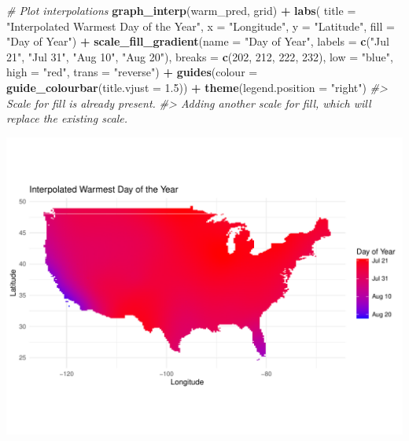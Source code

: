\documentclass[
]{article}
\newenvironment{Shaded}{\begin{snugshade}}{\end{snugshade}}
\newcommand{\AttributeTok}[1]{\textcolor[rgb]{0.13,0.29,0.53}{#1}}
\newcommand{\CommentTok}[1]{\textcolor[rgb]{0.56,0.35,0.01}{\textit{#1}}}
\newcommand{\DecValTok}[1]{\textcolor[rgb]{0.00,0.00,0.81}{#1}}
\newcommand{\FloatTok}[1]{\textcolor[rgb]{0.00,0.00,0.81}{#1}}
\newcommand{\FunctionTok}[1]{\textcolor[rgb]{0.13,0.29,0.53}{\textbf{#1}}}
\newcommand{\NormalTok}[1]{#1}
\newcommand{\SpecialCharTok}[1]{\textcolor[rgb]{0.81,0.36,0.00}{\textbf{#1}}}
\newcommand{\StringTok}[1]{\textcolor[rgb]{0.31,0.60,0.02}{#1}}
\begin{document}
\begin{Shaded}
\begin{Highlighting}[]
\CommentTok{\# Plot interpolations}
\FunctionTok{graph\_interp}\NormalTok{(warm\_pred, grid) }\SpecialCharTok{+} 
  \FunctionTok{labs}\NormalTok{( }\AttributeTok{title =} \StringTok{"Interpolated Warmest Day of the Year"}\NormalTok{,}
    \AttributeTok{x =} \StringTok{"Longitude"}\NormalTok{, }\AttributeTok{y =} \StringTok{"Latitude"}\NormalTok{, }
    \AttributeTok{fill =} \StringTok{"Day of Year"}\NormalTok{) }\SpecialCharTok{+}
\FunctionTok{scale\_fill\_gradient}\NormalTok{(}\AttributeTok{name =} \StringTok{"Day of Year"}\NormalTok{, }
                    \AttributeTok{labels =} \FunctionTok{c}\NormalTok{(}\StringTok{"Jul 21"}\NormalTok{, }\StringTok{"Jul 31"}\NormalTok{, }\StringTok{"Aug 10"}\NormalTok{, }\StringTok{"Aug 20"}\NormalTok{), }
                       \AttributeTok{breaks =} \FunctionTok{c}\NormalTok{(}\DecValTok{202}\NormalTok{, }\DecValTok{212}\NormalTok{, }\DecValTok{222}\NormalTok{, }\DecValTok{232}\NormalTok{), }
                    \AttributeTok{low =} \StringTok{"blue"}\NormalTok{, }\AttributeTok{high =} \StringTok{"red"}\NormalTok{, }
                    \AttributeTok{trans =} \StringTok{"reverse"}\NormalTok{) }\SpecialCharTok{+}
  \FunctionTok{guides}\NormalTok{(}\AttributeTok{colour =} \FunctionTok{guide\_colourbar}\NormalTok{(}\AttributeTok{title.vjust =} \FloatTok{1.5}\NormalTok{)) }\SpecialCharTok{+}
  \FunctionTok{theme}\NormalTok{(}\AttributeTok{legend.position =} \StringTok{"right"}\NormalTok{)}
\CommentTok{\#\textgreater{} Scale for fill is already present.}
\CommentTok{\#\textgreater{} Adding another scale for fill, which will replace the existing scale.}
\end{Highlighting}
\end{Shaded}

\includegraphics{seesaw_files/figure-latex/unnamed-chunk-8-1.pdf}
\end{document}
